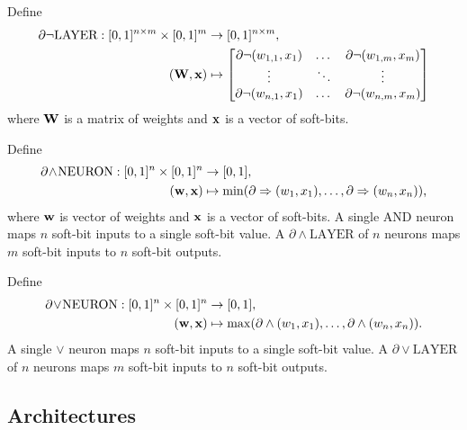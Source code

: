 \documentclass{article} %
\begin{document}
Define
\begin{equation*}
\begin{aligned}
\partial \neg \text{LAYER}: [0,1]^{n \times m} \times [0,1]^{m} &\to [0,1]^{n \times m}, \\
({\bf W}, {\bf x}) &\mapsto 
\begin{bmatrix}
\partial \neg(w_{1,1}, x_{1}) & \dots & \partial \neg(w_{1,m}, x_{m}) \\
\vdots & \ddots & \vdots \\
\partial \neg(w_{n,1}, x_{1}) & \dots & \partial \neg(w_{n,m}, x_{m})
\end{bmatrix}
\end{aligned}
\end{equation*}
where ${\bf W}$ is a matrix of weights and ${\bf x}$ is a vector of soft-bits.


Define
\begin{equation*}
\begin{aligned}
\partial\!\wedge\!\text{NEURON}: [0,1]^{n} \times [0,1]^{n} &\to [0,1], \\
({\bf w}, {\bf x}) &\mapsto \min(\partial \Rightarrow(w_{1}, x_{1}), \dots, \partial \Rightarrow(w_{n}, x_{n}))\text{,}
\end{aligned}
\end{equation*}
where ${\bf w}$ is vector of weights and ${\bf x}$ is a vector of soft-bits. A single AND neuron maps $n$ soft-bit inputs to a single soft-bit value. A $\partial\!\wedge\!\text{LAYER}$ of $n$ neurons maps $m$ soft-bit inputs to $n$ soft-bit outputs.

Define
\begin{equation*}
\begin{aligned}
\partial\!\vee\!\text{NEURON}: [0,1]^{n} \times [0,1]^{n} &\to [0,1], \\
({\bf w}, {\bf x}) &\mapsto \max(\partial \wedge(w_{1}, x_{1}), \dots, \partial \wedge(w_{n}, x_{n}))\text{.}
\end{aligned}
\end{equation*}
A single $\vee$ neuron maps $n$ soft-bit inputs to a single soft-bit value. A $\partial\!\vee\!\text{LAYER}$ of $n$ neurons maps $m$ soft-bit inputs to $n$ soft-bit outputs.

\subsection{Architectures}
\end{document}
